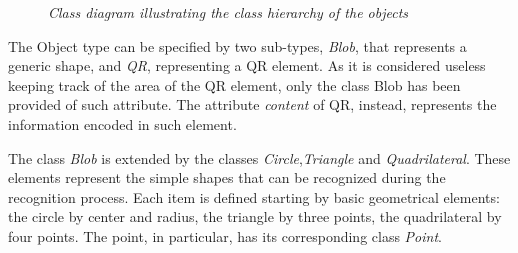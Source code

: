 	\begin{figure}[h]
	  \begin{center} 
	  \end{center} 
	  \caption{\textit{Class diagram illustrating the class hierarchy of the objects}}  
	  \label{fig:HierarchyDesign}
 	\end{figure}

	The Object type can be specified by two sub-types, \emph{Blob}, that represents a generic shape, and \emph{QR}, representing a \mbox{QR} element. As it is considered useless keeping track of the area of the \mbox{QR} element, only the class Blob has been provided of such attribute. The attribute \emph{content} of \mbox{QR}, instead, represents the information encoded in such element. 

	The class \emph{Blob} is extended by the classes \emph{Circle},\emph{Triangle} and \emph{Quadrilateral}. These elements represent the simple shapes that can be recognized during the recognition process. Each item is defined starting by basic geometrical elements: the circle by center and radius, the triangle by three points, the quadrilateral by four points. The point, in particular, has its corresponding class \emph{Point}. 

